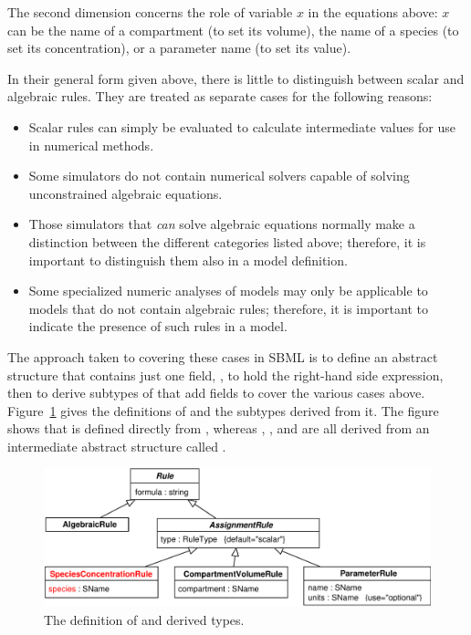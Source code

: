 \documentclass[10pt]{cekarticle}
\newcommand{\vref}[1]{\ref{#1}}
\newcommand{\changed}[1]{\textcolor{BrickRed}{#1}}
\newenvironment{blockChanged}{\color{BrickRed}}{}
\begin{document}
The second dimension concerns the role of variable $x$ in the equations
above: $x$ can be the name of a compartment (to set its volume), the name
of a \changed{species} (to set its concentration), or a parameter name (to
set its value).  

\begin{blockChanged}
In their general form given above, there is little to distinguish between
scalar and algebraic rules.  They are treated as separate cases for the
following reasons:
\begin{itemize}
  
\item Scalar rules can simply be evaluated to calculate intermediate
  values for use in numerical methods.
  
\item Some simulators do not contain numerical solvers capable of solving
  unconstrained algebraic equations.
  
\item Those simulators that \emph{can} solve algebraic equations normally
  make a distinction between the different categories listed above;
  therefore, it is important to distinguish them also in a model
  definition.
  
\item Some specialized numeric analyses of models may only be applicable to
  models that do not contain algebraic rules; therefore, it is important to
  indicate the presence of such rules in a model.
\end{itemize}
\end{blockChanged}

The approach taken to covering these cases in SBML is to define an abstract
 structure that contains just one field, , to
hold the right-hand side expression, then to derive subtypes of
 that add fields to cover the various cases above.
Figure~\vref{fig:rules} gives the definitions of  and the
subtypes derived from it.  The figure shows that  is
defined directly from , whereas ,
, and  are all derived
from an intermediate abstract structure called .

\begin{figure}[htb]
  \centering
  \vspace*{-3pt}
  \includegraphics[scale = 0.65]{figs/rule}
  \vspace*{-3pt}
  \caption{The definition of  and derived types.}
  \label{fig:rules}
\end{figure}
\end{document}
